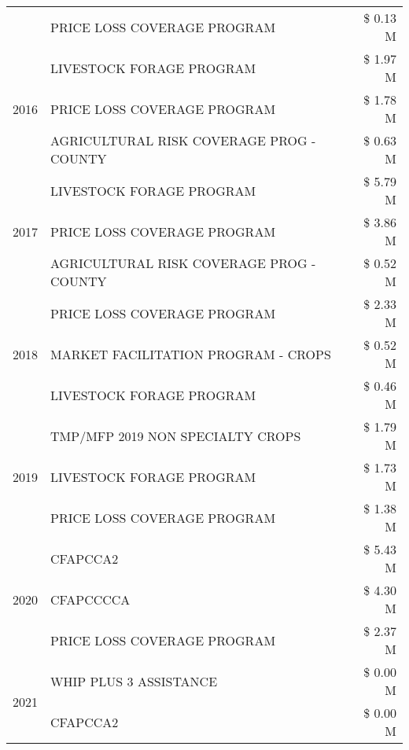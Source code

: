 \begin{tabular}{llr}
 & PRICE LOSS COVERAGE PROGRAM & \$ 0.13 M \\
\cline{1-3}
\multirow[t]{3}{*}{2016} & LIVESTOCK FORAGE PROGRAM & \$ 1.97 M \\
 & PRICE LOSS COVERAGE PROGRAM & \$ 1.78 M \\
 & AGRICULTURAL RISK COVERAGE PROG - COUNTY & \$ 0.63 M \\
\cline{1-3}
\multirow[t]{3}{*}{2017} & LIVESTOCK FORAGE PROGRAM & \$ 5.79 M \\
 & PRICE LOSS COVERAGE PROGRAM & \$ 3.86 M \\
 & AGRICULTURAL RISK COVERAGE PROG - COUNTY & \$ 0.52 M \\
\cline{1-3}
\multirow[t]{3}{*}{2018} & PRICE LOSS COVERAGE PROGRAM & \$ 2.33 M \\
 & MARKET FACILITATION PROGRAM - CROPS & \$ 0.52 M \\
 & LIVESTOCK FORAGE PROGRAM & \$ 0.46 M \\
\cline{1-3}
\multirow[t]{3}{*}{2019} & TMP/MFP 2019 NON SPECIALTY CROPS & \$ 1.79 M \\
 & LIVESTOCK FORAGE PROGRAM & \$ 1.73 M \\
 & PRICE LOSS COVERAGE PROGRAM & \$ 1.38 M \\
\cline{1-3}
\multirow[t]{3}{*}{2020} & CFAPCCA2 & \$ 5.43 M \\
 & CFAPCCCCA & \$ 4.30 M \\
 & PRICE LOSS COVERAGE PROGRAM & \$ 2.37 M \\
\cline{1-3}
\multirow[t]{2}{*}{2021} & WHIP PLUS 3 ASSISTANCE & \$ 0.00 M \\
 & CFAPCCA2 & \$ 0.00 M \\
\cline{1-3}
\bottomrule
\end{tabular}
